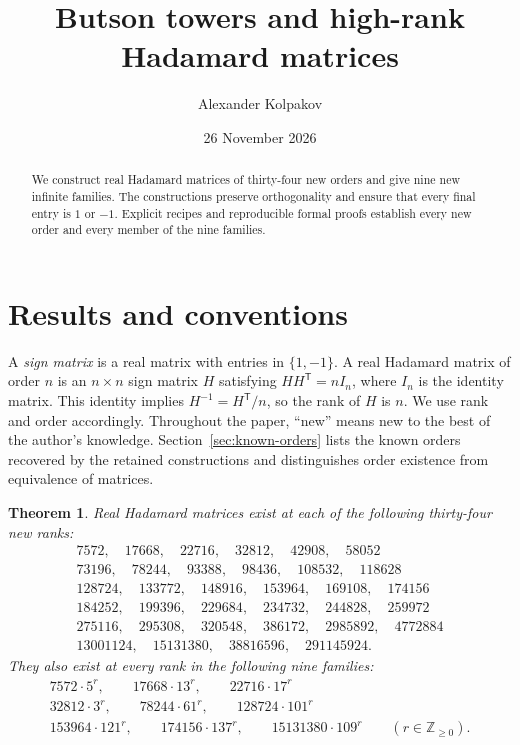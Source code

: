 \documentclass[10pt]{article}
\title{Butson towers and high-rank Hadamard matrices}
\author{Alexander Kolpakov}
\date{26 November 2026}
\newtheorem{theorem}{Theorem}
\begin{document}
\maketitle

\begin{abstract}
We construct real Hadamard matrices of thirty-four new orders and give nine
new infinite families.
The constructions preserve orthogonality and ensure that every final entry
is $1$ or $-1$. Explicit recipes and reproducible formal proofs establish
every new order and every member of the nine families.
\end{abstract}

\section{Results and conventions}

A \emph{sign matrix} is a real matrix with entries in $\{1,-1\}$.
A real Hadamard matrix of order $n$ is an $n\times n$ sign matrix $H$
satisfying $HH^{\mathsf T}=nI_n$, where $I_n$ is the identity matrix.
This identity implies $H^{-1}=H^{\mathsf T}/n$, so the rank of $H$ is $n$.
We use rank and order accordingly. Throughout the paper, ``new'' means
new to the best of the author's knowledge. Section~\ref{sec:known-orders}
lists the known orders recovered by the retained constructions and
distinguishes order existence from equivalence of matrices.

\begin{theorem}\label{thm:main}
Real Hadamard matrices exist at each of the following thirty-four new ranks:
\[
\begin{gathered}
7572,\quad17668,\quad22716,\quad32812,\quad42908,\quad58052\\
73196,\quad78244,\quad93388,\quad98436,\quad108532,\quad118628\\
128724,\quad133772,\quad148916,\quad153964,\quad169108,\quad174156\\
184252,\quad199396,\quad229684,\quad234732,\quad244828,\quad259972\\
275116,\quad295308,\quad320548,\quad386172,\quad2985892,\quad4772884\\
13001124,\quad15131380,\quad38816596,\quad291145924.
\end{gathered}
\]
They also exist at every rank in the following nine families:
\[
\begin{gathered}
7572\cdot5^r,\qquad17668\cdot13^r,\qquad22716\cdot17^r\\
32812\cdot3^r,\qquad78244\cdot61^r,\qquad128724\cdot101^r\\
153964\cdot121^r,\qquad174156\cdot137^r,\qquad15131380\cdot109^r
\qquad(r\in\mathbb Z_{\geq0}).
\end{gathered}
\]
\end{theorem}
\end{document}
